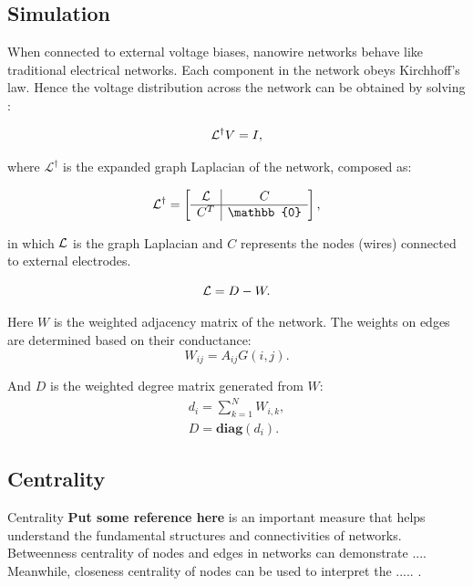 \documentclass[%
 reprint,
 amsmath,amssymb,
 aps,
]{revtex4-2}
\begin{document}
\subsection{\label{sec:level2} Simulation}
When connected to external voltage biases, nanowire networks behave like traditional electrical networks. Each component in the network obeys Kirchhoff's law. Hence the voltage distribution across the network can be obtained by solving \cite{Dorfler2018}:

\begin{equation}
{\cal L}^\dagger V = I,
\end{equation}

where $\mathcal{L}^\dagger$ is the expanded graph Laplacian of the network, composed as:

\begin{equation}
	\cal L^\dagger = 
	\left[
	\begin{array}{c|c}
	\cal L&  C\\ 
	\hline
	C^T & \mathbb{0}  
	\end{array}
	\right],
\end{equation}

in which $\cal L$ is the graph Laplacian and $C$ represents the nodes (wires) connected to external electrodes. 

\begin{equation}
{\cal L} = D - W.
\end{equation}

Here $W$ is the weighted adjacency matrix of the network. The weights on edges are determined based on their conductance:
\begin{equation}
	W_{ij} = A_{ij}G(i,j).
\end{equation}

And $D$ is the weighted degree matrix generated from $W$:
\begin{align}
	d_i = \sum \limits_{k=1}^{N} W_{i,k},\\
	D = \textbf{diag}(d_i).
\end{align}


\subsection{\label{sec:level2} Centrality}
Centrality \textbf{Put some reference here} is an important measure that helps understand the fundamental structures and connectivities of networks. Betweenness centrality of nodes and edges in networks can demonstrate .... Meanwhile, closeness centrality of nodes can be used to interpret the ..... \cite{Newman2010}.
\end{document}
